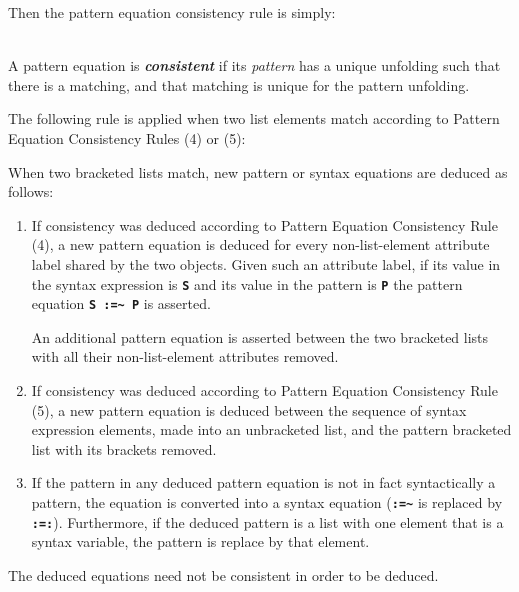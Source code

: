 \documentclass[12pt]{article}
\newcommand{\TT}[1]{{\tt \bfseries #1}}
\newcommand{\key}[1]{{\bf \em #1}\index{#1}}
\newcommand{\ikey}[2]{{\bf \em #1}\index{#2}}
\newcommand{\TILDE}{\textasciitilde}
\newenvironment{indpar}[1][0.3in]%
	{\begin{list}{}%
		     {\setlength{\itemsep}{0in}%
		      \setlength{\topsep}{0in}%
		      \setlength{\parsep}{1ex}%
		      \setlength{\labelwidth}{#1}%
		      \setlength{\leftmargin}{#1}%
		      \addtolength{\leftmargin}{\labelsep}}%
	 \item}%
	{\end{list}}
\begin{document}
Then the pattern equation consistency rule is simply:

\begin{indpar}
\begin{list}{}{}
\item[\ikey{Pattern Equation Consistency Rule}%
           {pattern equation consistency rule}:] ~\\
A pattern equation is \key{consistent} if its {\em pattern}
has a unique unfolding such that there is a matching,
and that matching is unique for the pattern unfolding.

\end{list}
\end{indpar}

The following rule is applied when two list elements match according
to Pattern Equation Consistency Rules (4) or (5):

\begin{indpar}
\begin{list}{}{}
\item[\ikey{Pattern Equation Propagation Rules}%
           {propagation rule!pattern equation}:]%
	   \label{PATTERN-EQUATION-PROPAGATION-RULE}
When two bracketed lists match, new pattern or syntax equations
are deduced as follows:
\begin{enumerate}
\item
If consistency was deduced according to Pattern Equation Consistency Rule (4),
a new pattern equation is deduced for every non-list-element
attribute label shared by the two objects.
Given such an attribute label, if its value in the syntax expression is
\TT{S} and its value in the pattern is \TT{P} the pattern equation
\TT{S :=\TILDE{} P} is asserted.

\medskip

An additional pattern equation is asserted between the two bracketed lists
with all their non-list-element attributes removed.


\item
If consistency was deduced according to Pattern Equation Consistency Rule (5),
a new pattern equation is deduced between the sequence of syntax expression
elements, made into an unbracketed list, and the pattern bracketed list
with its brackets removed.

\item
If the pattern in any deduced pattern equation is not in fact syntactically
a pattern, the equation is converted into a syntax equation
(\TT{:=\TILDE} is replaced by \TT{:=:}).  Furthermore, if the deduced
pattern is a list with one element that is a syntax variable, the pattern
is replace by that element.
\end{enumerate}

The deduced equations need not be consistent in order to be deduced.
\end{list}
\end{indpar}
\end{document}
